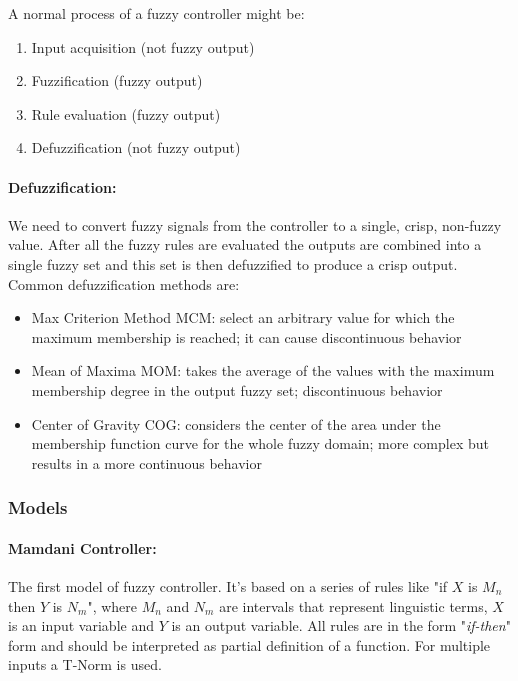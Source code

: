 A normal process of a fuzzy controller might be:
\begin{enumerate}
	\item Input acquisition (not fuzzy output)
	\item Fuzzification (fuzzy output)
	\item Rule evaluation (fuzzy output)
	\item Defuzzification (not fuzzy output)\\
\end{enumerate}

\paragraph{Defuzzification:} We need to convert fuzzy signals from the controller to a single, crisp, non-fuzzy value. After all the fuzzy rules are evaluated the outputs are combined into a single fuzzy set and this set is then defuzzified to produce a crisp output. Common defuzzification methods are: 
\begin{itemize}
	\item Max Criterion Method MCM: select an arbitrary value for which the maximum membership is reached; it can cause discontinuous behavior
	\item Mean of Maxima MOM: takes the average of the values with the maximum membership degree in the output fuzzy set; discontinuous behavior
	\item Center of Gravity COG: considers the center of the area under the membership function curve for the whole fuzzy domain; more complex but results in a more continuous behavior
\end{itemize}

\subsubsection{Models}

\paragraph{Mamdani Controller:} The first model of fuzzy controller. It's based on a series of rules like "if $X$ is $M_n$ then $Y$ is $N_m$", where $M_n$ and $N_m$ are intervals that represent linguistic terms, $X$ is an input variable and $Y$ is an output variable. All rules are in the form "\textit{if-then}" form and should be interpreted as partial definition of a function. For multiple inputs a T-Norm is used.\\

